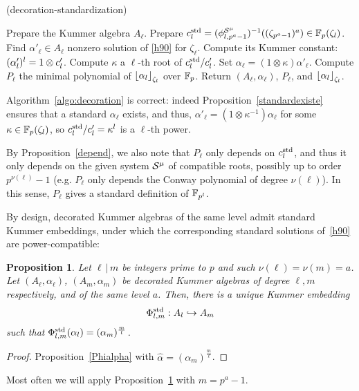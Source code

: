\documentclass{sig-alternate}
\newtheorem{proposition}[theorem]{Proposition}
\begin{document}
\begin{algorithm}
  \caption{(decoration-standardization)}
  \label{algo:decoration}
  \begin{algorithmic}[1]
  \STATE Prepare the Kummer algebra $A_\ell$.
  \STATE Prepare $c^{\textrm{std}}_l=({\phi^{\mathcal{S}^\mu}_{{l},{p^a-1}}})^{-1}((\zeta_{p^a-1})^a)\in\mathbb{F}_p(\zeta_l)$.
  \STATE Find $\alpha'_\ell\in A_\ell$ nonzero solution of \eqref{h90} for $\zeta_\ell$.
  \STATE Compute its Kummer constant: $(\alpha'_l)^l=1\otimes c'_l$.
  \STATE Compute $\kappa$ a $\ell$-th root of $c^{\textrm{std}}_l/c'_l$.
  \STATE Set $\alpha_{\ell}=(1\otimes\kappa)\alpha'_\ell$.
  \STATE Compute $P_\ell$ the minimal polynomial of $\left\lfloor \alpha_{l} \right\rfloor_{\zeta_l}$ over $\mathbb{F}_{p}$.
  \STATE Return $(A_\ell,\alpha_\ell)$, $P_\ell$, and $\left\lfloor \alpha_l \right\rfloor_{\zeta_l}$.
  \end{algorithmic}
\end{algorithm}

Algorithm~\ref{algo:decoration} is correct: indeed Proposition~\ref{standardexiste} ensures that
a standard $\alpha_{\ell}$ exists, and thus, $\alpha'_\ell=(1\otimes\kappa^{-1})\alpha_{\ell}$
for some $\kappa\in\mathbb{F}_{p}(\zeta_l)$, so $c^{\textrm{std}}_l/c'_l=\kappa^l$ is a $\ell$-th power.

By Proposition~\ref{depend}, we also note that $P_\ell$ only depends on $c^{\textrm{std}}_{l}$,
and thus it only depends on the given system $\mathcal{S}^\mu$ of compatible roots,
possibly up to order $p^{\nu(\ell)}-1$
(e.g. $P_\ell$ only depends the Conway polynomial of degree $\nu(\ell)$).
In this sense, $P_\ell$ gives a standard definition of $\mathbb{F}_{p^l}$.

By design, decorated Kummer algebras of the same level admit standard Kummer embeddings,
under which the corresponding standard solutions of~\eqref{h90} are power-compatible:
\begin{proposition}
\label{embedincomplete}
Let $\ell\,|\,m$ be integers prime to $p$ and such $\nu(\ell)=\nu(m)=a$.
Let $(A_\ell,\alpha_\ell)$, $(A_m,\alpha_m)$ be decorated Kummer algebras
of degree $\ell,m$ respectively, and of the same level $a$.
Then, there is a unique Kummer embedding
\[ {\Phi^{\textrm{std}}_{{l},{m}}}:A_l\hookrightarrow A_m \]
such that ${\Phi^{\textrm{std}}_{{l},{m}}}(\alpha_l)=(\alpha_m)^{\frac{m}{l}}$.
\end{proposition}
\begin{proof}
Proposition~\ref{Phialpha} with $\hat{\alpha}=(\alpha_m)^{\frac{m}{\ell}}$.
\end{proof}
Most often we will apply Proposition~\ref{embedincomplete} with $m=p^a-1$.
\end{document}

